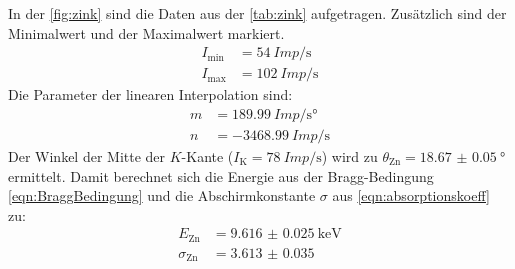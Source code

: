     \noindent
    In der \autoref{fig:zink} sind die Daten aus der \autoref{tab:zink} aufgetragen. Zusätzlich sind der Minimalwert und der Maximalwert markiert.
    \begin{align*}
      I_{\text{min}} &= \SI{54}{Imp\per\second}\\
      I_{\text{max}} &= \SI{102}{Imp\per\second}
    \end{align*}
    Die Parameter der linearen Interpolation sind:
    \begin{align*}
      m & = \SI{189.99}{Imp\per\second\degree}\\
      n & = \SI{-3468.99}{Imp\per\second}
    \end{align*}
    Der Winkel der Mitte der $K$-Kante ($I_{\text{K}} = \SI{78}{Imp\per\second}$) wird zu $\theta_{\text{Zn}} = \SI{18.67(5)}{\degree}$ ermittelt. 
    Damit berechnet sich die Energie aus der Bragg-Bedingung \eqref{eqn:BraggBedingung} und die Abschirmkonstante $\sigma$ aus \eqref{eqn:absorptionskoeff} zu:
    \begin{align*}
      E_{\text{Zn}} &= \SI{9.616(25)}{\kilo\electronvolt}\\
      \sigma_{\text{Zn}} &= \num{3.613(35)}
    \end{align*}

